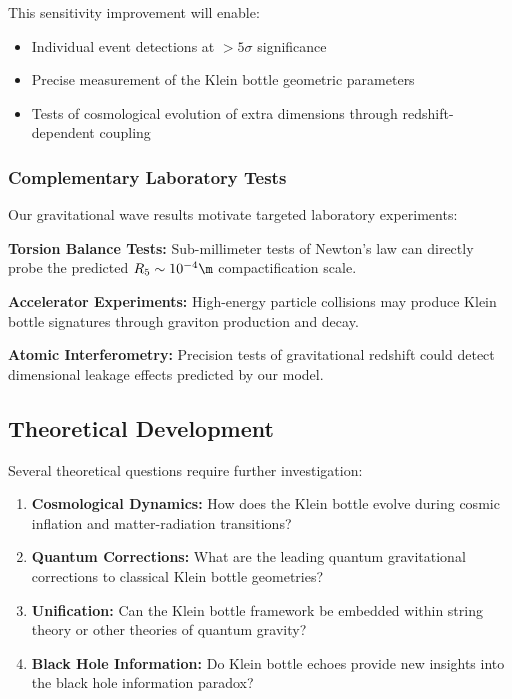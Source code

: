 \documentclass[reprint,amsmath,amssymb,aps,prd]{revtex4-2}
\begin{document}
This sensitivity improvement will enable:
\begin{itemize}
\item Individual event detections at $> 5\sigma$ significance
\item Precise measurement of the Klein bottle geometric parameters
\item Tests of cosmological evolution of extra dimensions through redshift-dependent coupling
\end{itemize}

\subsubsection{Complementary Laboratory Tests}

Our gravitational wave results motivate targeted laboratory experiments:

\textbf{Torsion Balance Tests:} Sub-millimeter tests of Newton's law can directly probe the predicted $R_5 \sim 10^{-4}\m$ compactification scale.

\textbf{Accelerator Experiments:} High-energy particle collisions may produce Klein bottle signatures through graviton production and decay.

\textbf{Atomic Interferometry:} Precision tests of gravitational redshift could detect dimensional leakage effects predicted by our model.

\subsection{Theoretical Development}

Several theoretical questions require further investigation:

\begin{enumerate}
\item \textbf{Cosmological Dynamics:} How does the Klein bottle evolve during cosmic inflation and matter-radiation transitions?

\item \textbf{Quantum Corrections:} What are the leading quantum gravitational corrections to classical Klein bottle geometries?

\item \textbf{Unification:} Can the Klein bottle framework be embedded within string theory or other theories of quantum gravity?

\item \textbf{Black Hole Information:} Do Klein bottle echoes provide new insights into the black hole information paradox?
\end{enumerate}
\end{document}
